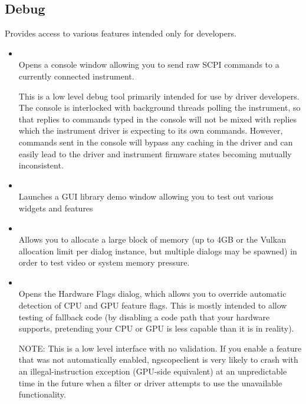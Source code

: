 
\subsection{Debug}

Provides access to various features intended only for developers.

\begin{itemize}

\item {}\\
Opens a console window allowing you to send raw SCPI commands to a currently connected instrument.

This is a low level debug tool primarily intended for use by driver developers. The console is interlocked with
background threads polling the instrument, so that replies to commands typed in the console will not be mixed with
replies which the instrument driver is expecting to its own commands. However, commands sent in the console will bypass
any caching in the driver and can easily lead to the driver and instrument firmware states becoming mutually
inconsistent.

\item {}\\

Launches a GUI library demo window allowing you to test out various widgets and features

\item {}\\

Allows you to allocate a large block of memory (up to 4GB or the Vulkan allocation limit per dialog instance, but
multiple dialogs may be spawned) in order to test video or system memory pressure.

\item {}\\
Opens the Hardware Flags dialog, which allows you to override automatic detection of CPU and GPU feature flags. This is mostly intended to allow testing of fallback code (by disabling a code path that your hardware supports, pretending your CPU or GPU is less capable than it is in reality).

NOTE: This is a low level interface with no validation. If you enable a feature that was not automatically enabled, ngscopeclient is very likely to crash with an illegal-instruction exception (GPU-side equivalent) at an unpredictable time in the future when a filter or driver attempts to use the unavailable functionality.


\end{itemize}
